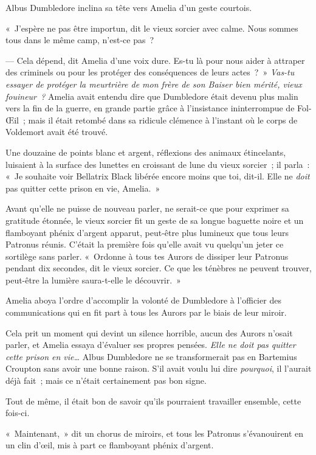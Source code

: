 Albus Dumbledore inclina sa tête vers Amelia d'un geste courtois.

«~J'espère ne pas être importun, dit le vieux sorcier avec calme.
Nous sommes tous dans le même camp, n'est-ce pas~?

--- Cela dépend, dit Amelia d'une voix dure.
Es-tu là pour nous aider à attraper des criminels ou pour les protéger des conséquences de leurs actes~?~»
\emph{Vas-tu essayer de protéger la meurtrière de mon frère de son Baiser bien mérité, vieux fouineur~?} Amelia avait entendu dire que Dumbledore était devenu plus malin vers la fin de la guerre, en grande partie grâce à l'insistance ininterrompue de Fol-Œil~; mais il était retombé dans sa ridicule clémence à l'instant où le corps de Voldemort avait été trouvé.

Une douzaine de points blanc et argent, réflexions des animaux étincelants, luisaient à la surface des lunettes en croissant de lune du vieux sorcier~; il parla~: «~Je souhaite voir Bellatrix Black libérée encore moins que toi, dit-il.
Elle ne \emph{doit} pas quitter cette prison en vie, Amelia.~»

Avant qu'elle ne puisse de nouveau parler, ne serait-ce que pour exprimer sa gratitude étonnée, le vieux sorcier fit un geste de sa longue baguette noire et un flamboyant phénix d'argent apparut, peut-être plus lumineux que tous leurs Patronus réunis.
C'était la première fois qu'elle avait vu quelqu'un jeter ce sortilège sans parler.
«~Ordonne à tous tes Aurors de dissiper leur Patronus pendant dix secondes, dit le vieux sorcier.
Ce que les ténèbres ne peuvent trouver, peut-être la lumière saura-t-elle le découvrir.~»

Amelia aboya l'ordre d'accomplir la volonté de Dumbledore à l'officier des communications qui en fit part à tous les Aurors par le biais de leur miroir.

Cela prit un moment qui devint un silence horrible, aucun des Aurors n'osait parler, et Amelia essaya d'évaluer ses propres pensées.
\emph{Elle ne doit pas quitter cette prison en vie…} Albus Dumbledore ne se transformerait pas en Bartemius Croupton sans avoir une bonne raison.
S'il avait voulu lui dire \emph{pourquoi}, il l'aurait déjà fait~; mais ce n'était certainement pas bon signe.

Tout de même, il était bon de savoir qu'ils pourraient travailler ensemble, cette fois-ci.

«~Maintenant,~» dit un chorus de miroirs, et tous les Patronus s'évanouirent en un clin d'œil, mis à part ce flamboyant phénix d'argent.

